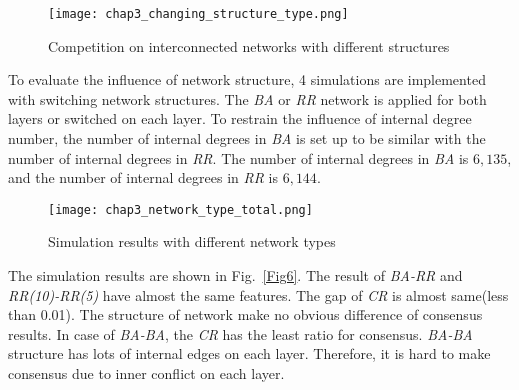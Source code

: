 \begin{figure}[!htb]
	\centering
	\texttt{[image: chap3\_changing\_structure\_type.png]}
	\caption{Competition on interconnected networks with different structures}
	\label{chap3_changing_structure_type}
\end{figure}
To evaluate the influence of network structure, 4 simulations are implemented with switching network structures. The \textit{BA} or \textit{RR} network is applied for both layers or switched on each layer. To restrain the influence of internal degree number, the number of internal degrees in \textit{BA} is set up to be similar with the number of internal degrees in \textit{RR}. The number of internal degrees in \textit{BA} is $6,135$, and the number of internal degrees in \textit{RR} is $6,144$. 

\begin{figure}[!htb]
	\centering
	\texttt{[image: chap3\_network\_type\_total.png]}
	\caption{Simulation results with different network types}
	\label{chap3_network_type_total}
\end{figure}

The simulation results are shown in Fig.~\ref{Fig6}. The result of \textit{BA-RR} and \textit{RR(10)-RR(5)} have almost the same features. The gap of \textit{CR} is almost same(less than 0.01). The structure of network make no obvious difference of consensus results. In case of \textit{BA-BA}, the \textit{CR} has the least ratio for consensus. \textit{BA-BA} structure has lots of internal edges on each layer. Therefore, it is hard to make consensus due to inner conflict on each layer. 


